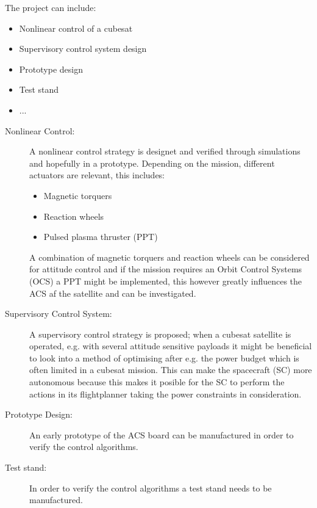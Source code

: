 The project can include:
\begin{itemize}\tightlist
  \item Nonlinear control of a cubesat
  \item Supervisory control system design
  \item Prototype design
  \item Test stand
  \item ...
\end{itemize}

\begin{description}
  \item[Nonlinear Control:] A nonlinear control strategy is designet and verified through simulations and hopefully in a prototype. Depending on the mission, different actuators are relevant, this includes:
    \begin{itemize}\tightlist
      \item Magnetic torquers
      \item Reaction wheels
      \item Pulsed plasma thruster (PPT)
    \end{itemize}
    A combination of magnetic torquers and reaction wheels can be considered for attitude control and if the mission requires an Orbit Control Systems (OCS) a PPT might be implemented, this however greatly influences the ACS af the satellite and can be investigated.
  \item[Supervisory Control System:] A supervisory control strategy is proposed; when a cubesat satellite is operated, e.g. with several attitude sensitive payloads it might be beneficial to look into a method of optimising after e.g. the power budget which is often limited in a cubesat mission. This can make the spacecraft (SC) more autonomous because this makes it posible for the SC to perform the actions in its flightplanner taking the power constraints in consideration.
  \item[Prototype Design:] An early prototype of the ACS board can be manufactured in order to verify the control algorithms.
  \item[Test stand:] In order to verify the control algorithms a test stand needs to be manufactured.
\end{description}
